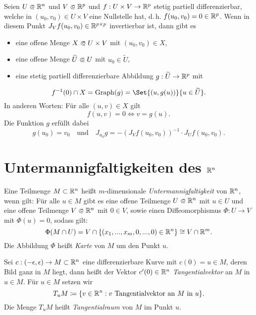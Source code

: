 \documentclass{cheat-sheet}
\DeclareMathOperator{\Graph}{Graph} %
\begin{document}
\begin{samepage}

\begin{satz}
  Seien $U \opn \R^n$ und $V \opn \R^p$ und $f : U \times V \to \mathbb{R}^p$ stetig partiell differenzierbar, welche in $(u_0, v_0) \in U \times V$ eine Nullstelle hat, d.\,h. $f(u_0, v_0) = 0 \in \mathbb{R}^p$. Wenn in diesem Punkt $J_V f(u_0, v_0) \in \mathbb{R}^{p \times p}$ invertierbar ist, dann gibt es
  \begin{itemize}
    \item eine offene Menge $X \opn U \times V$ mit $(u_0, v_0) \in X$,
    \item eine offene Menge $\widetilde{U} \opn U$ mit $u_0 \in \widetilde{U}$,
    \item eine stetig partiell differenzierbare Abbildung $g : \widetilde{U} \to \mathbb{R}^p$ mit
  \end{itemize}
  \[ f^{-1}(0) \cap X = \Graph(g) = \Set{ (u, g(u)) }{ u \in \widetilde{U} }. \]
  In anderen Worten: Für alle $(u, v) \in X$ gilt
  \[ f(u, v) = 0 \iff v = g(u). \]
  Die Funktion $g$ erfüllt dabei
  \[ g(u_0) = v_0\quad\text{und}\quad J_{u_0} g = - \left(J_V f(u_0, v_0)\right)^{-1} \cdot J_U f(u_0, v_0). \]
\end{satz}


\section{Untermannigfaltigkeiten des $\mathbb{R}^n$}

\end{samepage}

\begin{defn}
  Eine Teilmenge $M \subset \mathbb{R}^n$ heißt $m$-dimensionale \emph{Untermannigfaltigkeit} von $\mathbb{R}^n$, wenn gilt: Für alle $u \in M$ gibt es eine offene Teilmenge $U \opn \R^n$ mit $u \in U$ und eine offene Teilmenge $V \opn \R^n$ mit $0 \in V$, sowie einen Diffeomorphismus $\Phi : U \to V$ mit $\Phi(u) = 0$, sodass gilt:
    \[ \Phi(M \cap U) = V \cap \{ (x_1, ..., x_m, 0, ..., 0) \in \mathbb{R}^n \} \cong V \cap \mathbb{R}^m. \]
  Die Abbildung $\Phi$ heißt \emph{Karte} von $M$ um den Punkt $u$.
\end{defn}

\begin{defn}
  Sei $c : \left( -\epsilon, \epsilon \right) \to M \subset \mathbb{R}^n$ eine differenzierbare Kurve mit $c(0) = u \in M$, deren Bild ganz in $M$ liegt, dann heißt der Vektor $c'(0) \in \mathbb{R}^n$ \emph{Tangentialvektor} an $M$ in $u \in M$. Für $u \in M$ setzen wir
  \[ T_u M \coloneqq \{ v \in \mathbb{R}^n : v \text{ Tangentialvektor an } M \text{ in } u \}. \]
  Die Menge $T_u M$ heißt \emph{Tangentialraum} von $M$ im Punkt $u$.
\end{defn}
\end{document}
